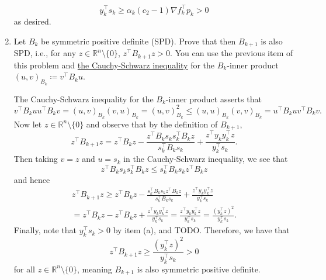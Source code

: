 \documentclass{../kin_math}
\begin{document}
\begin{questions}
\begin{enumerate}
\begin{solution}
      \begin{equation*}
        y_k^\top s_k \geq \alpha_k (c_2 - 1) \nabla f_k^\top p_k > 0
      \end{equation*}
      as desired.
    \end{solution}
    \item Let $B_k$ be symmetric positive definite (SPD). Prove that then $B_{k + 1}$ is also SPD, i.e., for any $z \in \mathbb{R}^n \setminus \{0\}$, $z^\top B_{k + 1} z > 0$. You can use the previous item of this problem and \href{https://en.wikipedia.org/wiki/Cauchy%E2%80%93Schwarz_inequality}{the Cauchy-Schwarz inequality} for the $B_k$-inner product $(u, v)_{B_k} \coloneqq v^\top B_k u$.
    \begin{solution}
      The Cauchy-Schwarz inequality for the $B_k$-inner product asserts that
      \begin{equation*}
        v^\top B_k u u^\top B_k v = (u, v)_{B_k} (v, u)_{B_k} = (u, v)_{B_k}^2 \leq (u, u)_{B_k} (v, v)_{B_k} = u^\top B_k u v^\top B_k v.
      \end{equation*}
      Now let $z \in \mathbb{R}^n \setminus \{0\}$ and observe that by the definition of $B_{k + 1}$,
      \begin{equation*}
        z^\top B_{k + 1} z = z^\top B_k z - \frac{z^\top B_k s_k s_k^\top B_k z}{s_k^\top B_k s_k} + \frac{z^\top  y_k y_k^\top z}{y_k^\top s_k}.
      \end{equation*}
      Then taking $v = z$ and $u = s_k$ in the Cauchy-Schwarz inequality, we see that
      \begin{equation*}
        z^\top B_k s_k s_k^\top B_k z \leq s_k^\top B_k s_k z^\top B_k z
      \end{equation*}
      and hence
      \begin{multline*}
        z^\top B_{k + 1} z \geq z^\top B_k z - \frac{s_k^\top B_k s_k z^\top B_k z}{s_k^\top B_k s_k} + \frac{z^\top  y_k y_k^\top z}{y_k^\top s_k} \\
        = z^\top B_k z - z^\top B_k z + \frac{z^\top  y_k y_k^\top z}{y_k^\top s_k} = \frac{z^\top  y_k y_k^\top z}{y_k^\top s_k} = \frac{(y_k^\top z)^2}{y_k^\top s_k}.
      \end{multline*}
      Finally, note that $y_k^\top s_k > 0$ by item (a), and TODO. Therefore, we have that
      \begin{equation*}
        z^\top B_{k + 1} z \geq \frac{(y_k^\top z)^2}{y_k^\top s_k} > 0
      \end{equation*}
      for all $z \in \mathbb{R}^n \setminus \{0\}$, meaning $B_{k + 1}$ is also symmetric positive definite.
    \end{solution}
  \end{enumerate}


\end{questions}
\end{document}
